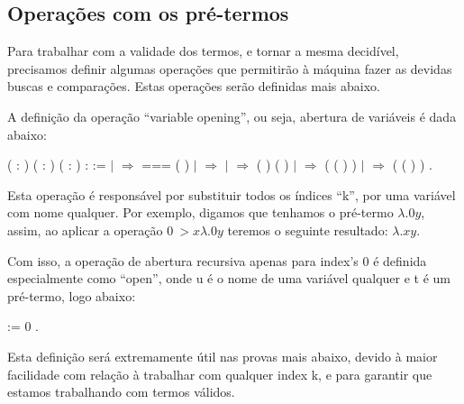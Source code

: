 \subsection{Operações com os pré-termos}



 Para trabalhar com a validade dos termos, e tornar a mesma decidível, precisamos definir
algumas operações que permitirão à máquina fazer as devidas buscas e comparações. Estas operações
serão definidas mais abaixo.

 A definição da operação ``variable opening'', ou seja, abertura de variáveis é dada abaixo:\begin{coqdoccode}
\coqdocemptyline
\coqdocnoindent
{}  ( : ) ( : ) ( : ) :  :=\coqdoceol
\coqdocindent{1.00em}
  \coqdoceol
\coqdocindent{1.00em}
\ensuremath{|}      \ensuremath{\Rightarrow}   ===     ( )\coqdoceol
\coqdocindent{1.00em}
\ensuremath{|}      \ensuremath{\Rightarrow}  \coqdoceol
\coqdocindent{1.00em}
\ensuremath{|}    \ensuremath{\Rightarrow}  (   ) (   )\coqdoceol
\coqdocindent{1.00em}
\ensuremath{|}      \ensuremath{\Rightarrow}  ( ( )  )\coqdoceol
\coqdocindent{1.00em}
\ensuremath{|}      \ensuremath{\Rightarrow}  ( ( )  )\coqdoceol
\coqdocindent{1.00em}
.\coqdoceol
\coqdocemptyline
\end{coqdoccode}
Esta operação é responsável por substituir todos os índices ``k'', por uma variável com
nome qualquer. Por exemplo, digamos que tenhamos o pré-termo $\lambda.0 y$, assim, ao aplicar
a operação $ {0 ~> x} \lambda.0 y$ teremos o seguinte resultado: $\lambda.x y$.

 Com isso, a operação de abertura recursiva apenas para index's 0 é definida especialmente 
como ``open'', onde u é o nome de uma variável qualquer e t é um pré-termo, logo abaixo:\begin{coqdoccode}
\coqdocemptyline
\coqdocnoindent
{}    :=  0  .\coqdoceol
\coqdocemptyline
\end{coqdoccode}
Esta definição será extremamente útil nas provas mais abaixo, devido à maior facilidade com relação
à trabalhar com qualquer index k, e para garantir que estamos trabalhando com termos válidos.

